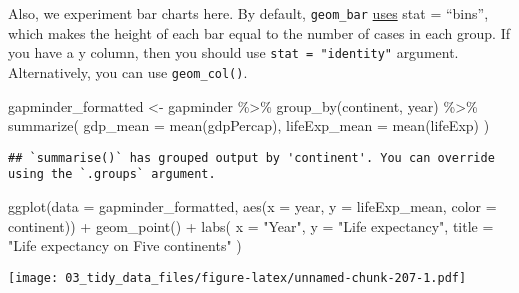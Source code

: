 \documentclass[
]{book}
\newenvironment{Shaded}{\begin{snugshade}}{\end{snugshade}}
\newcommand{\AttributeTok}[1]{\textcolor[rgb]{0.77,0.63,0.00}{#1}}
\newcommand{\FunctionTok}[1]{\textcolor[rgb]{0.00,0.00,0.00}{#1}}
\newcommand{\NormalTok}[1]{#1}
\newcommand{\OtherTok}[1]{\textcolor[rgb]{0.56,0.35,0.01}{#1}}
\newcommand{\SpecialCharTok}[1]{\textcolor[rgb]{0.00,0.00,0.00}{#1}}
\newcommand{\StringTok}[1]{\textcolor[rgb]{0.31,0.60,0.02}{#1}}
\begin{document}
Also, we experiment bar charts here. By default, \texttt{geom\_bar} \href{https://www.rdocumentation.org/packages/ggplot2/versions/1.0.1/topics/geom_bar}{uses} stat = ``bins'', which makes the height of each bar equal to the number of cases in each group. If you have a y column, then you should use \texttt{stat\ =\ "identity"} argument. Alternatively, you can use \texttt{geom\_col()}.

\begin{Shaded}
\begin{Highlighting}[]
\NormalTok{gapminder\_formatted }\OtherTok{\textless{}{-}}\NormalTok{ gapminder }\SpecialCharTok{\%\textgreater{}\%}
  \FunctionTok{group\_by}\NormalTok{(continent, year) }\SpecialCharTok{\%\textgreater{}\%}
  \FunctionTok{summarize}\NormalTok{(}
    \AttributeTok{gdp\_mean =} \FunctionTok{mean}\NormalTok{(gdpPercap),}
    \AttributeTok{lifeExp\_mean =} \FunctionTok{mean}\NormalTok{(lifeExp)}
\NormalTok{  )}
\end{Highlighting}
\end{Shaded}

\begin{verbatim}
## `summarise()` has grouped output by 'continent'. You can override using the `.groups` argument.
\end{verbatim}

\begin{Shaded}
\begin{Highlighting}[]
\FunctionTok{ggplot}\NormalTok{(}\AttributeTok{data =}\NormalTok{ gapminder\_formatted, }\FunctionTok{aes}\NormalTok{(}\AttributeTok{x =}\NormalTok{ year, }\AttributeTok{y =}\NormalTok{ lifeExp\_mean, }\AttributeTok{color =}\NormalTok{ continent)) }\SpecialCharTok{+}
  \FunctionTok{geom\_point}\NormalTok{() }\SpecialCharTok{+}
  \FunctionTok{labs}\NormalTok{(}
    \AttributeTok{x =} \StringTok{"Year"}\NormalTok{,}
    \AttributeTok{y =} \StringTok{"Life expectancy"}\NormalTok{,}
    \AttributeTok{title =} \StringTok{"Life expectancy on Five continents"}
\NormalTok{  )}
\end{Highlighting}
\end{Shaded}

\texttt{[image: 03\_tidy\_data\_files/figure-latex/unnamed-chunk-207-1.pdf]}
\end{document}
